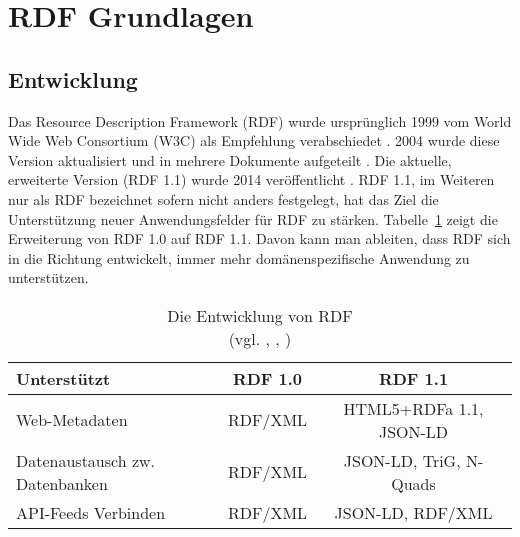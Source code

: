 \section{RDF Grundlagen}
\subsection{Entwicklung}
Das Resource Description Framework (RDF) wurde ursprünglich 1999 vom World Wide Web Consortium (W3C) als Empfehlung verabschiedet \parencite{Lassila:99:RMS}. 2004 wurde diese Version aktualisiert und in mehrere Dokumente aufgeteilt \parencite{Beckett:04:RSS}. Die aktuelle, erweiterte Version (RDF 1.1) wurde 2014 veröffentlicht \parencite{Schreiber:14:RP}. RDF 1.1, im Weiteren nur als RDF bezeichnet sofern nicht anders festgelegt, hat das Ziel die Unterstützung neuer Anwendungsfelder für RDF zu stärken. Tabelle~\ref{tab:rdf} zeigt die Erweiterung von RDF 1.0 auf RDF 1.1. Davon kann man ableiten, dass RDF sich in die Richtung entwickelt, immer mehr domänenspezifische Anwendung zu unterstützen.
\begin{table}[h]
	\centering
	\begin{tabular}{|p{9em}|c|c|}
		\hline \rule[-2ex]{0pt}{5.5ex} Unterstützt & RDF 1.0 & RDF 1.1 \\ 
		\hline \rule[-2ex]{0pt}{5.5ex} Web-Metadaten & RDF/XML & HTML5+RDFa 1.1, JSON-LD\\ 
		\hline \rule[-2ex]{0pt}{5.5ex} Datenaustausch zw. Datenbanken & RDF/XML\footnotemark & JSON-LD, TriG, N-Quads  \\
		\hline \rule[-2ex]{0pt}{5.5ex} API-Feeds Verbinden & RDF/XML\footnotemark[\value{footnote}] & JSON-LD, RDF/XML\\ 
		\hline
	\end{tabular}
	\caption{Die Entwicklung von RDF\\ (vgl. \cite[Abs.~2]{Klyne:04:RDF}, \cite[Abs.~2]{Schreiber:14:RP}, \cite{Wood:14:WNR})}
	\label{tab:rdf}
\end{table}

